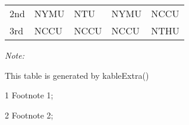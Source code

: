 \begin{table}
\begin{threeparttable}
\begin{tabular}[t]{lllll}
\hspace{1em}2nd & NYMU & NTU & NYMU & NCCU\\
\hspace{1em}3rd & NCCU & NCCU & NCCU & NTHU\\
\bottomrule
\end{tabular}
\begin{tablenotes}
\item \textit{Note: } 
\item This table is generated by kableExtra()
\item[1] Footnote 1; 
\item[2] Footnote 2; 
\end{tablenotes}
\end{threeparttable}
\end{table}
